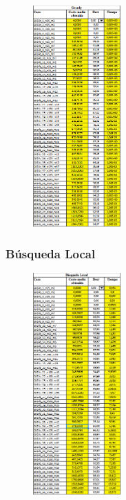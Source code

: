 \documentclass{article}
\begin{document}
    \begin{figure}[h]
        \centering
        \includegraphics[width=0.3\textwidth]{tablaGreddy.png}
    \end{figure}

    \pagebreak

    \subsubsection{Búsqueda Local}

    \begin{figure}[h]
        \centering
        \includegraphics[width=0.3\textwidth]{tablaBL.png}
    \end{figure}
\end{document}
